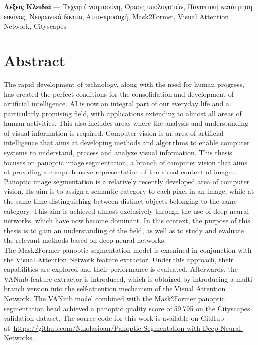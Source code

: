 \documentclass[12pt]{article}
\numberwithin{equation}{section}
\begin{document}
\noindent\textbf{Λέξεις Κλειδιά} — Τεχνητή νοημοσύνη, Όραση υπολογιστών, Πανοπτική κατάτμηση εικόνας, Νευρωνικά δίκτυα, Αυτο-προσοχή, Mask2Former, Visual Attention Network, Cityscapes

\newpage
\mbox{}
\newpage

\section*{Abstract}

The rapid development of technology, along with the need for human progress, has created the
perfect conditions for the consolidation and development of artificial intelligence. AI is now an integral part of
our everyday life and a particularly promising field, with applications extending to almost all areas of
human activities. This also includes areas where the analysis and understanding of visual information is
required. Computer vision is an area of artificial intelligence that aims at developing methods and
algorithms to enable computer systems to understand, process and analyze visual information. This thesis
focuses on panoptic image segmentation, a branch of computer vision that aims at providing a
comprehensive representation of the visual content of images. \\

Panoptic image segmentation is a relatively recently developed area of computer vision. Its aim is to assign a
semantic category to each pixel in an image, while at the same time distinguishing between distinct
objects belonging to the same category. This aim is achieved almost exclusively through the use of deep
neural networks, which have now become dominant. In this context, the purpose of this thesis is to gain
an understanding of the field, as well as to study and evaluate the relevant methods based on deep neural networks.\\

The Mask2Former panoptic segmentation model is examined in conjunction with the Visual Attention Network feature extractor. Under this approach, their capabilities are explored and their performance is evaluated. Afterwards, the VANmb feature extractor is introduced, which is obtained by introducing a multi-branch version into the self-attention mechanism of the Visual Attention Network. The VANmb model combined with the Mask2Former panoptic segmentation head achieved a panoptic quality score of 59.795
on the Cityscapes validation dataset. The source code for this work is available on GitHub at~\url{https://github.com/Nikolasioan/Panoptic-Segmentation-with-Deep-Neural-Networks}.\\
\end{document}
